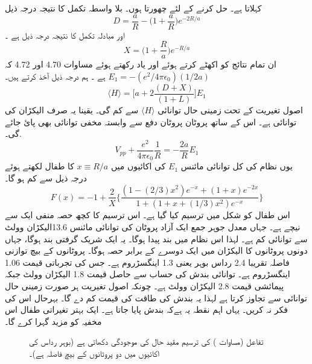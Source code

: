 کہلاتا ہے۔ حل کرنے کے لئے چھورتا ہوں۔ بلا واسطہ تکمل کا نتیجہ درجہ ذیل 
\[D=\frac{a}{R}-\big(1+\frac{a}{R}\big)e^{-2R/a}\]
اور مبادلہ تکمل کا نتیجہ درجہ ذیل ہے ۔ 
\[X=\big(1+\frac{R}{a}\big)e^{-R/a}\]
ان تمام نتائج کو اکھٹے کرتے ہوئے اور یاد رکھتے ہوئے مساوات 4.70 اور 4.72 کہ 
\(E_{1}=-(e^{2}/4\pi\epsilon_{0})(1/2a)\)
ہے ۔ ہم درجہ ذیل آخذ کرتے ہیں۔
\[\langle H \rangle =\big[a+2\frac{(D+X)}{(1+L)}\big]E_{1}\]
اصول تغیریت کے تحت زمینی حال توانائی 
\(\langle H \rangle\)
 سے کم گی۔ یقینا یہ صرف الیکڑان کی توانائی ہے۔ اس کے ساتھ پروٹان پروٹان دفع سے وابستہ مخفی توانائی بھی پائ جائے گی۔.
\[V_{pp}+\frac{e^{2}}{4\pi\epsilon_{0}}\frac{1}{R}=-\frac{2a}{R}E_{1}\]
یوں نظام کی کل توانائی مائنس
\(E_{1}\)
 کی اکائیوں میں 
 \(x\equiv R/a\)
 کا طفال لکھتے ہوئے درجہ ذیل سے کم ہو گا۔
 \[F(x)=-1+\frac{2}{X}\big\{\frac{(1-(2/3)x^{2})e^{-x}+(1+x)e^{-2x}}{1+(1+x+(1/3)x^{2})e^{-x}}\big\}\]
اس طفال کو شکل   میں ترسیم کیا گیا ہے۔ اس ترسیم کا کچھ حصہ منفی ایک سے نیچے ہے۔ جہاں معدل جوہر جمع ایک آزاد پروٹان کی توانائی مائنس 13.6الیکڑان وولٹ سے توانائی کم ہے۔ لہذا اس نظام میں بند پیدا ہوگا۔ یہ ایک شریک گرفتی بند ہوگا، جہاں دونوں پروٹانوں کا الیکڑان میں ایک دوسرے کے برابر حصہ ہوگا۔ پروٹانوں کے بیچ توازنی فاصلہ تقریبا 2.4 رداس بوہر یعنی 1.3 اینگسڑروم ہے۔ جس کی تجرباتی قیمت 1.06 اینگسڑروم ہے۔ توانائی بندش کی حساب سے حاصل قیمت 1.8 الیکڑان وولٹ جبکہ پیمائشی قیمت 2.8 الیکڑان وولٹ ہے۔ چونکہ اصول تغیریت ہر صورت زمینی حال توانائی سے تجاوز کرتا ہے لہذا یہ بندش کی طاقت کی قیمت کم دے گا۔ بہرحال اس کی فکر نہ کریں۔ یہاں اہم نقطہ یہ ہےکہ بندش پایا جاتا ہے۔ ایک بہتر تغیراتی طفال اس مخفیہ کو مزید گہرا کرے گا۔ 
\begin{figure}
\centering
{}
\caption{تفاعل  (مساوات ) کی ترسیم مقید حال کی موجودگی دکھاتی ہے (بوہر رداس کی اکائیوں میں  دو پروٹانوں کے بیچ فاصلہ ہے)۔ }
\label{شکل_تغیریت_مقید_حال}
\end{figure}


